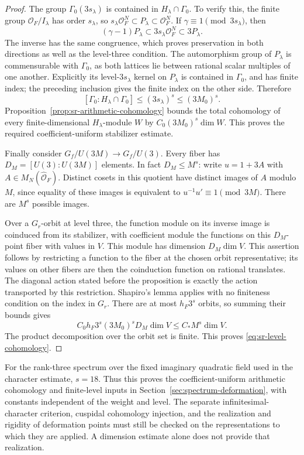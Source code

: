 \begin{proof}
The group \(\Gamma_0(3s_\lambda)\) is contained in
\(H_\lambda\cap\Gamma_0\).
To verify this, the finite group \(\mathcal O_F/I_\lambda\) has
order \(s_\lambda\), so
\(s_\lambda\mathcal O_F^N\subset P_\lambda\subset\mathcal O_F^N\).
If \(\gamma\equiv1\pmod{3s_\lambda}\), then
\[
       (\gamma-1)P_\lambda\subset
                    3s_\lambda\mathcal O_F^N\subset3P_\lambda.
\]
The inverse has the same congruence, which proves preservation in
both directions as well as the level-three condition.
The automorphism group of \(P_\lambda\) is commensurable with
\(\Gamma_0\), as both lattices lie between rational scalar multiples
of one another. Explicitly its level-\(3s_\lambda\) kernel on
\(P_\lambda\) is contained in \(\Gamma_0\), and has finite index;
the preceding inclusion gives the finite index on the other side.
Therefore
\[
 [\Gamma_0:H_\lambda\cap\Gamma_0]
                             \leq(3s_\lambda)^s\leq(3M_0)^s.
\]
Proposition~\ref{prop:sr-arithmetic-cohomology} bounds the total
cohomology of every finite-dimensional \(H_\lambda\)-module \(W\)
by \(C_0(3M_0)^s\dim W\).
This proves the required coefficient-uniform stabilizer estimate.

Finally consider \(G_f/U(3M)\to G_f/U(3)\).
Every fiber has \(D_M=[U(3):U(3M)]\) elements.
In fact \(D_M\leq M^s\): write \(u=1+3A\) with
\(A\in M_N(\widehat{\mathcal O}_F)\).
Distinct cosets in this quotient have distinct images of \(A\)
modulo \(M\), since equality of these images is equivalent to
\(u^{-1}u'\equiv1\pmod{3M}\).
There are \(M^s\) possible images.

Over a \(G_r\)-orbit at level three, the function module on its
inverse image is coinduced from its stabilizer, with coefficient
module the functions on this \(D_M\)-point fiber with values in
\(V\). This module has dimension \(D_M\dim V\).
This assertion follows by restricting a function to the fiber at
the chosen orbit representative; its values on other fibers are
then the coinduction function on rational translates.
The diagonal action stated before the proposition is exactly the
action transported by this restriction.
Shapiro's lemma applies with no finiteness condition on the index
in \(G_r\).
There are at most \(h_F3^s\) orbits, so summing their bounds gives
\[
 C_0 h_F3^s(3M_0)^sD_M\dim V
                   \leq C_*M^s\dim V.
\]
The product decomposition over the orbit set is finite.
This proves \eqref{eq:sr-level-cohomology}.
\end{proof}

For the rank-three spectrum over the fixed imaginary quadratic
field used in the character estimate, \(s=18\).
Thus this proves the coefficient-uniform arithmetic cohomology and
finite-level inputs in Section~\ref{sec:spectrum-deformation},
with constants independent of the weight and level.
The separate infinitesimal-character criterion, cuspidal cohomology
injection, and the realization and rigidity of deformation points
must still be checked on the representations to which they are applied.
A dimension estimate alone does not provide that realization.

